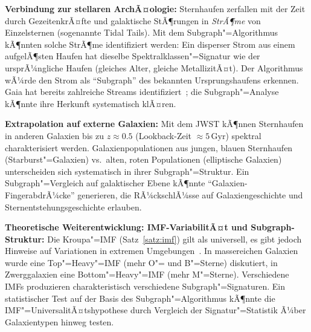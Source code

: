 ﻿\documentclass[a4paper,12pt]{article}
\theoremstyle{definition}
\begin{document}
\textbf{Verbindung zur stellaren ArchÃ¤ologie:}
Sternhaufen zerfallen mit der Zeit durch GezeitenkrÃ¤fte und
galaktische StÃ¶rungen in \emph{StrÃ¶me} von Einzelsternen
(sogenannte Tidal Tails). Mit dem Subgraph"=Algorithmus kÃ¶nnten
solche StrÃ¶me identifiziert werden: Ein disperser Strom aus einem
aufgelÃ¶sten Haufen hat dieselbe Spektralklassen"=Signatur wie der
ursprÃ¼ngliche Haufen (gleiches Alter, gleiche MetallizitÃ¤t).
Der Algorithmus wÃ¼rde den Strom als ``Subgraph'' des bekannten
Ursprungshaufens erkennen. Gaia hat bereits zahlreiche Streams
identifiziert~\cite{ibata2021}; die Subgraph"=Analyse kÃ¶nnte ihre
Herkunft systematisch klÃ¤ren.

\textbf{Extrapolation auf externe Galaxien:}
Mit dem JWST kÃ¶nnen Sternhaufen in anderen Galaxien bis zu
$z \approx 0.5$ (Lookback-Zeit $\approx 5\,\text{Gyr}$) spektral
charakterisiert werden. Galaxienpopulationen aus jungen, blauen
Sternhaufen (Starburst"=Galaxien) vs.\ alten, roten Populationen
(elliptische Galaxien) unterscheiden sich systematisch in ihrer
Subgraph"=Struktur. Ein Subgraph"=Vergleich auf galaktischer Ebene
kÃ¶nnte ``Galaxien-FingerabdrÃ¼cke'' generieren, die RÃ¼ckschlÃ¼sse auf
Galaxiengeschichte und Sternentstehungsgeschichte erlauben.

\textbf{Theoretische Weiterentwicklung: IMF-VariabilitÃ¤t und Subgraph-Struktur:}
Die Kroupa"=IMF (Satz~\ref{satz:imf}) gilt als universell, es gibt jedoch
Hinweise auf Variationen in extremen Umgebungen~\cite{kroupa2001}.
In massereichen Galaxien wurde eine Top"=Heavy"=IMF (mehr O"= und B"=Sterne)
diskutiert, in Zwerggalaxien eine Bottom"=Heavy"=IMF (mehr M"=Sterne).
Verschiedene IMFs produzieren charakteristisch verschiedene Subgraph"=Signaturen.
Ein statistischer Test auf der Basis des Subgraph"=Algorithmus kÃ¶nnte die
IMF"=UniversalitÃ¤tshypothese durch Vergleich der Signatur"=Statistik Ã¼ber
Galaxientypen hinweg testen.
\end{document}
